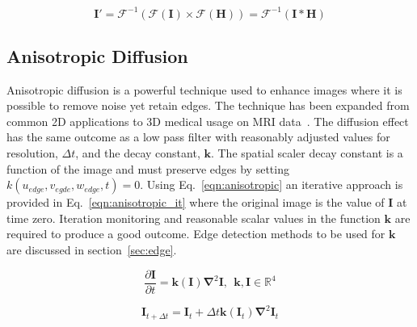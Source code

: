 \documentclass[journal]{IEEEtran}
\begin{document}

\begin{equation}
	\textbf{I}' = \mathcal{F}^{-1}(\mathcal{F}(\textbf{I})\times\mathcal{F}(\textbf{H})) = \mathcal{F}^{-1}(\textbf{I}*\textbf{H})		%
	\label{eqn:same} 
\end{equation}


\subsection{Anisotropic Diffusion}
Anisotropic diffusion is a powerful technique used to enhance images where it is possible to remove noise yet retain edges.
The technique has been expanded from common 2D applications to 3D medical usage on MRI data~\cite{nakh11three}.
The diffusion effect has the same outcome as a low pass filter with reasonably adjusted values for resolution, $\Delta t$, and the decay constant, $\mathbf{k}$.
The spatial scaler decay constant is a function of the image and must preserve edges by setting $k(u_{edge},v_{egde},w_{edge},t) = 0$.
Using Eq.~\eqref{eqn:anisotropic} an iterative approach is provided in Eq.~\eqref{eqn:anisotropic_it} where the original image is the value of $\mathbf{I}$ at time zero.
Iteration monitoring and reasonable scalar values in the function $\mathbf{k}$ are required to produce a good outcome.
Edge detection methods to be used for $\mathbf{k}$ are discussed in section~\ref{sec:edge}.

\begin{equation}
	\frac{\partial \mathbf{I}}{\partial t} = \mathbf{k(\mathbf{I})} \mathbf{\nabla}^2 \mathbf{I},\:\:\mathbf{k},\mathbf{I} \in \mathbb{R}^4
	\label{eqn:anisotropic} 
\end{equation}

\begin{equation}
	\mathbf{I}_{t + \Delta t} = \mathbf{I}_t + \Delta t\mathbf{k}(\mathbf{I}_t)\mathbf{\nabla}^2\mathbf{I}_t
	\label{eqn:anisotropic_it} 
\end{equation}
\end{document}
